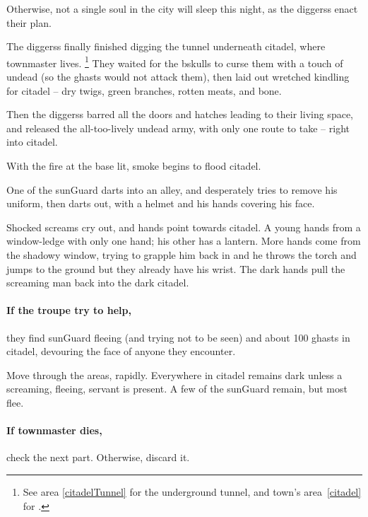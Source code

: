 Otherwise, not a single soul in the city will sleep this night, as the \glspl{diggers} enact their plan.

\begin{exampletext}
  The \glspl{diggers} finally finished digging the tunnel underneath \gls{citadel}, where \gls{townmaster} lives.%
  \footnote{See \gls{area} \vref{citadelTunnel} for the underground tunnel, and \gls{town}'s \gls{area}~\vref{citadel} for .}
  They waited for the \gls{bskulls} to curse them with a touch of undead (so the ghasts would not attack them), then laid out wretched kindling for \gls{citadel} -- dry twigs, green branches, rotten meats, and bone.

  Then the \glspl{diggers} barred all the doors and hatches leading to their living space, and released the all-too-lively undead army, with only one route to take -- right into \gls{citadel}.

  With the fire at the base lit, smoke begins to flood \gls{citadel}.
\end{exampletext}

\begin{boxtext}
  One of the \gls{sunGuard} darts into an alley, and desperately tries to remove his uniform, then darts out, with a helmet and his hands covering his face.

  Shocked screams cry out, and hands point towards \gls{citadel}.
  A young hands from a window-ledge with only one hand; his other has a lantern.
  More hands come from the shadowy window, trying to grapple him back in and he throws the torch and jumps to the ground but they already have his wrist.
  The dark hands pull the screaming man back into the dark citadel.
\end{boxtext}

\paragraph{If the troupe try to help,}
they find \gls{sunGuard} fleeing (and trying not to be seen) and about 100 ghasts in \gls{citadel}, devouring the face of anyone they encounter.

Move through the areas, rapidly.
Everywhere in \gls{citadel} remains dark unless a screaming, fleeing, servant is present.
A few of the \gls{sunGuard} remain, but most flee.


\paragraph{If \gls{townmaster} dies,}
check the next part.
Otherwise, discard it.

